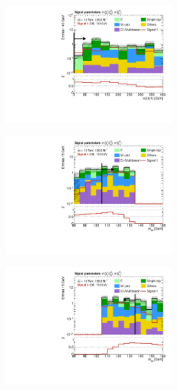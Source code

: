 \begin{figure}
\begin{subfigure}[b]{0.5\linewidth}
		\caption{}
	\end{subfigure}\hfill
	\begin{subfigure}[b]{0.5\linewidth}
		\centering\includegraphics[width=0.7\textwidth]{N-1_cut_scan/n1_300_150/mlb1}
		\caption{}
	\end{subfigure}\hfill
	\begin{subfigure}[b]{0.5\linewidth}
		\centering\includegraphics[width=0.7\textwidth]{N-1_cut_scan/n1_300_150/mbb_lower}
		\caption{}
	\end{subfigure}\hfill
	\begin{subfigure}[b]{0.5\linewidth}
		\centering\includegraphics[width=0.7\textwidth]{N-1_cut_scan/n1_300_150/mbb_upper}

\end{subfigure}
\end{figure}
